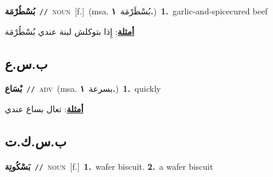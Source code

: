 \documentclass[10pt,a4paper,twoside]{article} %
\begin{document}
\begin{multicols}{2}
{\setlength\topsep{0pt}\textbf{\foreignlanguage{arabic}{بُسْطُرْمَة}}\ {\color{gray}\texttt{//}\color{black}}\ \textsc{noun}\ [f.]\ \color{gray}(msa. \foreignlanguage{arabic}{بُسْطَرْمَة}~\foreignlanguage{arabic}{\textbf{١.}})\color{black}\ \textbf{1.}~garlic-and-spicecured beef\  \begin{flushright}\color{gray}\foreignlanguage{arabic}{\textbf{\underline{\foreignlanguage{arabic}{أمثلة}}}: إِذا بتوكلش لبنة عندي بُسْطُرْمَة}\end{flushright}\color{black}} \vspace{2mm}

\vspace{-3mm}
\subsection*{\color{blue}\foreignlanguage{arabic}{ب.س.ع}\color{blue}{ (ntws)}} 

{\setlength\topsep{0pt}\textbf{\foreignlanguage{arabic}{بْسَاع}}\ {\color{gray}\texttt{//}\color{black}}\ \textsc{adv}\ \color{gray}(msa. \foreignlanguage{arabic}{بسرعة}~\foreignlanguage{arabic}{\textbf{١.}})\color{black}\ \textbf{1.}~quickly\  \begin{flushright}\color{gray}\foreignlanguage{arabic}{\textbf{\underline{\foreignlanguage{arabic}{أمثلة}}}: تعال بساع عندي}\end{flushright}\color{black}} \vspace{2mm}

\vspace{-3mm}
\subsection*{\color{blue}\foreignlanguage{arabic}{ب.س.ك.ت}\color{blue}{ (ntws)}} 

{\setlength\topsep{0pt}\textbf{\foreignlanguage{arabic}{بَسْكُوتِة}}\ {\color{gray}\texttt{//}\color{black}}\ \textsc{noun}\ [f.]\ \textbf{1.}~wafer biscuit.  \textbf{2.}~a wafer biscuit\ } \vspace{2mm}


\end{multicols}
\end{document}
